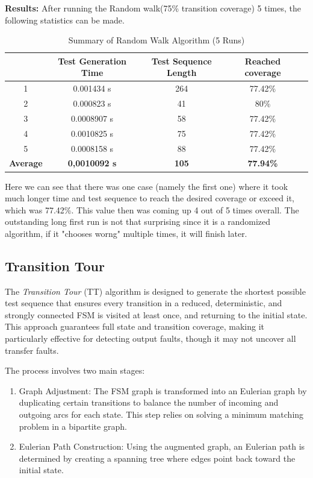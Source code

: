 \documentclass[main.tex]{subfiles}
\begin{document}
\textbf{Results:} After running the Random walk(75\% transition coverage) 5 times, the following statistics can be made.
\begin{table}[H]
\centering
\begin{tabular}{|c|c|c|c|c|}
\hline
 & \textbf{Test Generation Time} & \textbf{Test Sequence Length} & \textbf{Reached coverage} \\ \hline
1 & 0.001434 s & 264 & 77.42\% \\ \hline
2 & 0.000823 s & 41 & 80\% \\ \hline
3 & 0.0008907 s & 58 & 77.42\% \\ \hline
4 & 0.0010825 s & 75 & 77.42\% \\ \hline
5 & 0.0008158 s & 88 & 77.42\% \\ \hline
\textbf{Average} & \textbf{0,0010092 s} & \textbf{105} & \textbf{77.94\%} \\ \hline
\end{tabular}
\caption{Summary of Random Walk Algorithm (5 Runs)}
\label{table:random_walk_summary}
\end{table}
Here we can see that there was one case (namely the first one) where it took much longer time and test sequence to reach the desired coverage or exceed it, which was 77.42\%. This value then was coming up 4 out of 5 times overall. The outstanding long first run is not that surprising since it is a randomized algorithm, if it "chooses worng" multiple times, it will finish later.

\subsection{Transition Tour}

The \textit{Transition Tour} (TT) algorithm is designed to generate the shortest possible test sequence that ensures every transition in a reduced, deterministic, and strongly connected FSM is visited at least once, and returning to the initial state. This approach guarantees full state and transition coverage, making it particularly effective for detecting output faults, though it may not uncover all transfer faults.

The process involves two main stages: 
\begin{enumerate} 
\item Graph Adjustment: The FSM graph is transformed into an Eulerian graph by duplicating certain transitions to balance the number of incoming and outgoing arcs for each state. This step relies on solving a minimum matching problem in a bipartite graph. 
\item Eulerian Path Construction: Using the augmented graph, an Eulerian path is determined by creating a spanning tree where edges point back toward the initial state. 
\end{enumerate}
\end{document}
